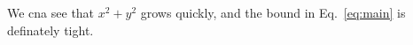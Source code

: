 We cna see that $x^2 + y^2$ grows quickly, and the bound in Eq.~\eqref{eq:main} is definately tight.
